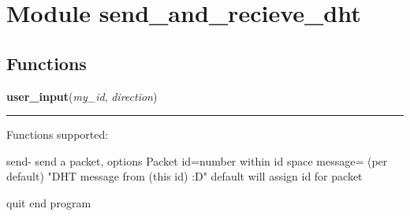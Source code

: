 %
%
%


\section{Module send\_and\_recieve\_dht}

    \label{send_and_recieve_dht}


  \subsection{Functions}

    \label{send_and_recieve_dht:user_input}

    \vspace{0.5ex}

\hspace{.8\funcindent}\begin{boxedminipage}{\funcwidth}

    \raggedright \textbf{user\_input}(\textit{my\_id}, \textit{direction})

    \vspace{-1.5ex}

    \rule{\textwidth}{0.5\fboxrule}
\setlength{\parskip}{2ex}
    Functions supported:

    send- send a packet, options Packet id=number within id space message= 
    (per default) "DHT message from (this id) :D" default will assign id 
    for packet

    quit end program

\setlength{\parskip}{1ex}
    \end{boxedminipage}

    \label{send_and_recieve_dht:send}

